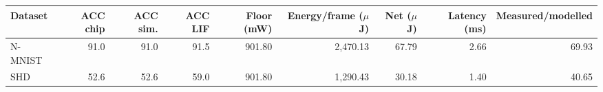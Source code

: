 \begin{tabular*}{\textwidth}{@{\extracolsep{\fill}}lrrrrrrrr@{}}
\toprule
Dataset & ACC chip & ACC sim. & ACC LIF & Floor (mW) & Energy/frame ($\mu$J) & Net ($\mu$J) & Latency (ms) & Measured/modelled \\
\midrule
N-MNIST & 91.0 & 91.0 & 91.5 & 901.80 & 2,470.13 & 67.79 & 2.66 & 69.93 \\
SHD & 52.6 & 52.6 & 59.0 & 901.80 & 1,290.43 & 30.18 & 1.40 & 40.65 \\
\bottomrule
\end{tabular*}
